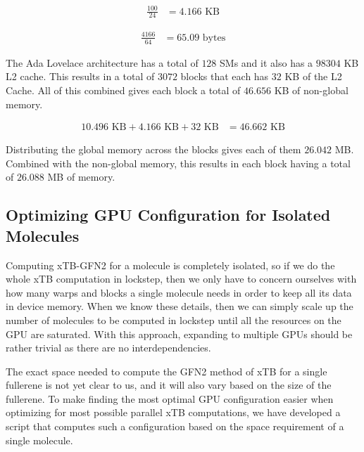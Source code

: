 \begin{equation}
\begin{split}
  \frac{100}{24} &= 4.166 \text{ KB}
\end{split}
\end{equation}

\begin{equation}
\begin{split}
  \frac{4166}{64} &= 65.09 \text{ bytes}
\end{split}
\end{equation}

The Ada Lovelace architecture has a total of $128$ SMs and it also has a $98304$ KB L2 cache. This results in a total of $3072$ blocks that each has $32$ KB of the L2 Cache. All of this combined gives each block a total of $46.656$ KB of non-global memory.

\begin{equation}
\begin{split}
  10.496 \text{ KB} + 4.166 \text{ KB} + 32 \text{ KB} &= 46.662 \text{ KB}
\end{split}
\end{equation}

Distributing the global memory across the blocks gives each of them $26.042$ MB. Combined with the non-global memory, this results in each block having a total of $26.088$ MB of memory.

\subsection{Optimizing GPU Configuration for Isolated Molecules}

Computing xTB-GFN2 for a molecule is completely isolated, so if we do the whole xTB computation in lockstep, then we only have to concern ourselves with how many warps and blocks a single molecule needs in order to keep all its data in device memory. When we know these details, then we can simply scale up the number of molecules to be computed in lockstep until all the resources on the GPU are saturated. With this approach, expanding to multiple GPUs should be rather trivial as there are no interdependencies.

The exact space needed to compute the GFN2 method of xTB for a single fullerene is not yet clear to us, and it will also vary based on the size of the fullerene. To make finding the most optimal GPU configuration easier when optimizing for most possible parallel xTB computations, we have developed a script that computes such a configuration based on the space requirement of a single molecule.

